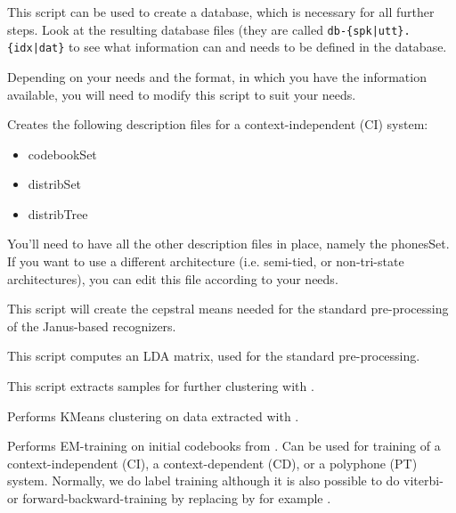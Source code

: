 \begin{description}

 \label{janus:genDBase.tcl}

  This script can be used to create a database, which is necessary for
  all further steps.  Look at the resulting  database files (they  are
  called \texttt{db-\{spk|utt\}.\{idx|dat\}} to see what   information
  can and needs to be defined in the database.

  Depending on your needs  and   the format, in   which you  have  the
  information  available, you will need  to modify this script to suit
  your needs.

    \label{janus:makeCI.tcl}

  Creates the following description files for a context-independent
  (CI) system:

  \begin{itemize}
    \item codebookSet
    \item distribSet
    \item distribTree
  \end{itemize}
  
  You'll need to have all the other description files in place, namely
  the phonesSet. If you want to use a different architecture
  (i.e. semi-tied, or non-tri-state architectures), you can edit this
  file according to your needs.

     \label{janus:means.tcl}

  This script will create the cepstral means needed for the standard
  pre-processing of the Janus-based recognizers.

       \label{janus:lda.tcl}

  This script computes an LDA matrix, used for the standard
  pre-processing.

   \label{janus:samples.tcl}

  This script extracts samples for further clustering with .

    \label{janus:kmeans.tcl}

  Performs KMeans clustering on data extracted with .

     \label{janus:train.tcl}

  Performs EM-training on initial codebooks from .
  Can be used for training of a context-independent (CI),
  a context-dependent (CD), or a polyphone (PT) system.
  Normally, we do label training although it is also possible
  to do viterbi- or forward-backward-training by replacing
   by for example .


\end{description}
